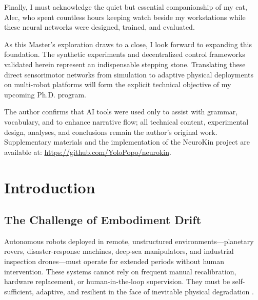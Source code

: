 \documentclass[12pt,a4paper,oneside]{report}
\begin{document}
Finally, I must acknowledge the quiet but essential companionship of my cat, Alec, who spent countless hours keeping watch beside my workstations while these neural networks were designed, trained, and evaluated.

As this Master's exploration draws to a close, I look forward to expanding this foundation. The synthetic experiments and decentralized control frameworks validated herein represent an indispensable stepping stone. Translating these direct sensorimotor networks from simulation to adaptive physical deployments on multi-robot platforms will form the explicit technical objective of my upcoming Ph.D. program.

The author confirms that AI tools were used only to assist with grammar, vocabulary, and to enhance narrative flow; all technical content, experimental design, analyses, and conclusions remain the author's original work. Supplementary materials and the implementation of the NeuroKin project are available at: \url{https://github.com/YoloPopo/neurokin}.

\clearpage

\tableofcontents
\clearpage
\listoffigures
{}
\clearpage
\listoftables
{}
\clearpage


\chapter{Introduction}
\label{chap:intro}

\section{The Challenge of Embodiment Drift}
\label{sec:challenge_embodiment_drift}

Autonomous robots deployed in remote, unstructured environments---planetary rovers, disaster-response machines, deep-sea manipulators, and industrial inspection drones---must operate for extended periods without human intervention. These systems cannot rely on frequent manual recalibration, hardware replacement, or human-in-the-loop supervision. They must be self-sufficient, adaptive, and resilient in the face of inevitable physical degradation \cite{bongard2006resilient, cully2015robots}.
\end{document}
